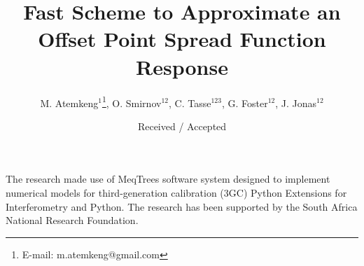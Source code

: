 \documentclass[]{aa}
\begin{document}
      

	      
\title{Fast Scheme to Approximate an Offset Point Spread Function Response}

\subtitle{}
\author{M. Atemkeng$^{1}$\thanks{E-mail: m.atemkeng@gmail.com}, O. Smirnov$^{12}$, 
 C. Tasse$^{123}$, G. Foster$^{12}$, J. Jonas$^{12}$}
\date{Received  / Accepted }


\abstract{
}




   \maketitle




 \begin{acknowledgements}
 The research  made use of  MeqTrees software system designed to implement numerical models for third-generation calibration (3GC) 
 Python Extensions for Interferometry and Python. The research has been supported by the South Africa National Research Foundation.
 \end{acknowledgements}

%
%


\appendix %

%
%

\end{document}
